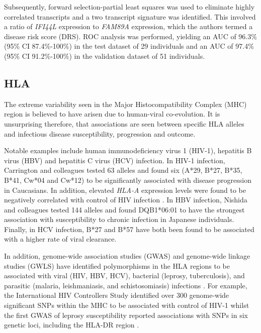 Subsequently, forward selection-partial least squares was used to eliminate highly correlated transcripts and a two transcript signature was identified. This involved a ratio of \textit{IFI44L} expression to \textit{FAM89A} expression, which the authors termed a disease risk score (DRS). ROC analysis was performed, yielding an AUC of 96.3\% (95\% CI 87.4\%-100\%) in the test dataset of 29 individuals and an AUC of 97.4\% (95\% CI 91.2\%-100\%) in the validation dataset of 51 individuals. 

\subsection{HLA}
The extreme variability seen in the Major Histocompatibility Complex (MHC) region is believed to have arisen due to human-viral co-evolution. It is unsurprising therefore, that associations are seen between specific HLA alleles and infectious disease susceptibility, progression and outcome. 

Notable examples include human immunodeficiency virus 1 (HIV-1), hepatitis B virus (HBV) and hepatitis C virus (HCV) infection. In HIV-1 infection, Carrington and colleagues \parencite{Carrington1999} tested 63 alleles and found six (A*29, B*27, B*35, B*41, Cw*04 and Cw*12) to be significantly associated with disease progression in Caucasians. In addition, elevated \textit{HLA-A} expression levels were found to be negatively correlated with control of HIV infection \parencite{Ramsuran2018}. In HBV infection, Nishida and colleagues \parencite{Nishida2016} tested 144 alleles and found DQB1*06:01 to have the strongest association with susceptibility to chronic infection in Japanese individuals. Finally, in HCV infection, B*27 \parencite{Neumann-Haefelin2006} and B*57 \parencite{Kim2011} have both been found to be associated with a higher rate of viral clearance. 

In addition, genome-wide association studies (GWAS) and genome-wide linkage studies (GWLS) have identified polymorphisms in the HLA regions to be associated with viral (HIV, HBV, HCV), bacterial (leprosy, tuberculosis), and parasitic (malaria, leishmaniasis, and schistosomiasis) infections \parencite{Blackwell2009}. For example, the International HIV Controllers Study \parencite{Pereyra2010} identified over 300 genome-wide significant SNPs within the MHC to be associated with control of HIV-1 whilst the first GWAS of leprosy susceptibility reported associations with SNPs in six genetic loci, including the HLA-DR region \parencite{Zhang2009}.  


